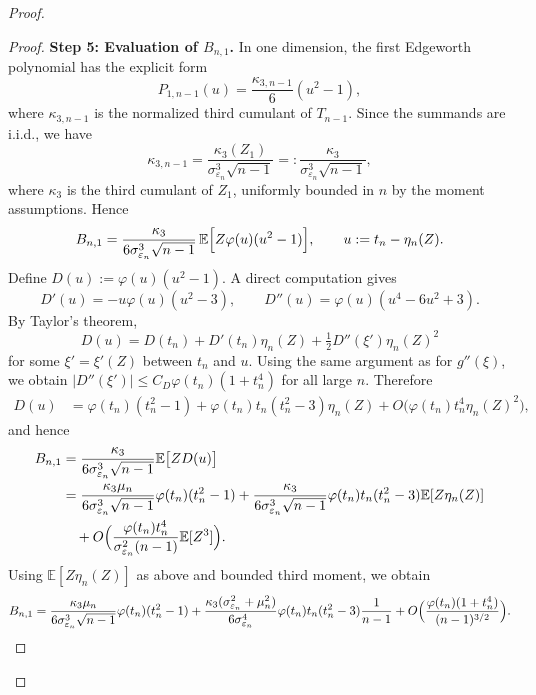 \documentclass{article}
\theoremstyle{plain}
\theoremstyle{definition}
\begin{document}
\begin{proof}
\begin{proof}
\medskip\noindent\textbf{Step 5: Evaluation of $B_{n,1}$.}
In one dimension, the first Edgeworth polynomial has the explicit form
\[
  P_{1,n-1}(u)
  = \frac{\kappa_{3,n-1}}{6}(u^2-1),
\]
where $\kappa_{3,n-1}$ is the normalized third cumulant of $T_{n-1}$.
Since the summands are i.i.d., we have
\[
  \kappa_{3,n-1}
  = \frac{\kappa_3(Z_1)}{\sigma_{\varepsilon_n}^3\sqrt{n-1}}
  =: \frac{\kappa_3}{\sigma_{\varepsilon_n}^3\sqrt{n-1}},
\]
where $\kappa_3$ is the third cumulant of $Z_1$, uniformly bounded in
$n$ by the moment assumptions. Hence
\[
  B_{n,1}
  = \frac{\kappa_3}{6\sigma_{\varepsilon_n}^3\sqrt{n-1}}\,
    \mathbb E\Bigl[
      Z\varphi(u)(u^2-1)
    \Bigr],
  \qquad u:=t_n-\eta_n(Z).
\]
Define $D(u):=\varphi(u)(u^2-1)$. A direct computation gives
\[
  D'(u) = -u\varphi(u)(u^2-3),
  \qquad
  D''(u) = \varphi(u)(u^4-6u^2+3).
\]
By Taylor's theorem,
\[
  D(u)
  = D(t_n) + D'(t_n)\eta_n(Z) + \tfrac12 D''(\xi')\eta_n(Z)^2
\]
for some $\xi'=\xi'(Z)$ between $t_n$ and $u$. Using the same argument
as for $g''(\xi)$, we obtain
\(
  |D''(\xi')|
  \le C_D\varphi(t_n)(1+t_n^4)
\)
for all large $n$. Therefore
\begin{align*}
  D(u)
  &= \varphi(t_n)(t_n^2-1)
    +\varphi(t_n)t_n(t_n^2-3)\eta_n(Z)
    +O\bigl(\varphi(t_n)t_n^4\eta_n(Z)^2\bigr),
\end{align*}
and hence
\begin{align}
  B_{n,1}
  &= \frac{\kappa_3}{6\sigma_{\varepsilon_n}^3\sqrt{n-1}}
     \mathbb E\bigl[Z D(u)\bigr]\notag\\
  &= \frac{\kappa_3\mu_n}{6\sigma_{\varepsilon_n}^3\sqrt{n-1}}
     \varphi(t_n)(t_n^2-1)
   + \frac{\kappa_3}{6\sigma_{\varepsilon_n}^3\sqrt{n-1}}
     \varphi(t_n)t_n(t_n^2-3)\mathbb E[Z\eta_n(Z)]\notag\\
  &\quad
   + O\Bigl(
       \frac{\varphi(t_n)t_n^4}{\sigma_{\varepsilon_n}^2(n-1)}
       \mathbb E[Z^3]
     \Bigr).\label{eq:B-n-1-raw}
\end{align}
Using $\mathbb E[Z\eta_n(Z)]$ as above and bounded third moment, we
obtain
\begin{equation}
  \label{eq:B-n-1-expansion}
  B_{n,1}
  = \frac{\kappa_3\mu_n}{6\sigma_{\varepsilon_n}^3\sqrt{n-1}}
      \varphi(t_n)(t_n^2-1)
    + \frac{\kappa_3(\sigma_{\varepsilon_n}^2+\mu_n^2)}
           {6\sigma_{\varepsilon_n}^4}
      \varphi(t_n)t_n(t_n^2-3)\frac{1}{n-1}
    + O\Bigl(
        \frac{\varphi(t_n)(1+t_n^4)}{(n-1)^{3/2}}
      \Bigr).
\end{equation}


\end{proof}
\end{proof}
\end{document}
